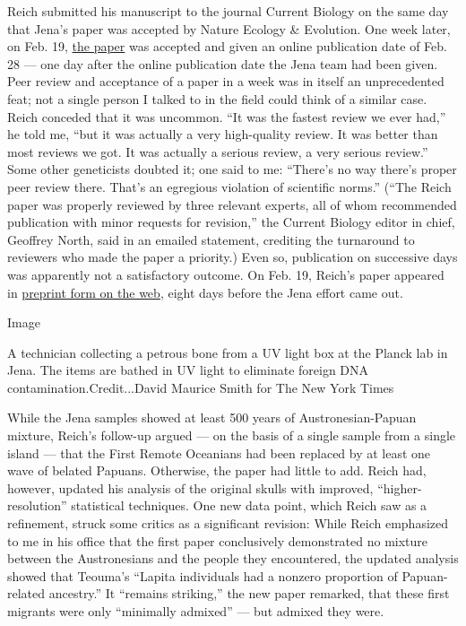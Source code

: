 Reich submitted his manuscript to the journal Current Biology on the
same day that Jena's paper was accepted by Nature Ecology \& Evolution.
One week later, on Feb. 19,
\href{https://www.cell.com/current-biology/fulltext/S0960-9822(18)30236-7?innerTabgraphical_S0960982218302367=}{the
paper} was accepted and given an online publication date of Feb. 28 ---
one day after the online publication date the Jena team had been given.
Peer review and acceptance of a paper in a week was in itself an
unprecedented feat; not a single person I talked to in the field could
think of a similar case. Reich conceded that it was uncommon. ``It was
the fastest review we ever had,'' he told me, ``but it was actually a
very high-quality review. It was better than most reviews we got. It was
actually a serious review, a very serious review.'' Some other
geneticists doubted it; one said to me: ``There's no way there's proper
peer review there. That's an egregious violation of scientific norms.''
(``The Reich paper was properly reviewed by three relevant experts, all
of whom recommended publication with minor requests for revision,'' the
Current Biology editor in chief, Geoffrey North, said in an emailed
statement, crediting the turnaround to reviewers who made the paper a
priority.) Even so, publication on successive days was apparently not a
satisfactory outcome. On Feb. 19, Reich's paper appeared in
\href{https://www.biorxiv.org/content/early/2018/02/19/268037}{preprint
form on the web}, eight days before the Jena effort came out.

Image

A technician collecting a petrous bone from a UV light box at the Planck
lab in Jena. The items are bathed in UV light to eliminate foreign DNA
contamination.Credit...David Maurice Smith for The New York Times

While the Jena samples showed at least 500 years of Austronesian-Papuan
mixture, Reich's follow-up argued --- on the basis of a single sample
from a single island --- that the First Remote Oceanians had been
replaced by at least one wave of belated Papuans. Otherwise, the paper
had little to add. Reich had, however, updated his analysis of the
original skulls with improved, ``higher-resolution'' statistical
techniques. One new data point, which Reich saw as a refinement, struck
some critics as a significant revision: While Reich emphasized to me in
his office that the first paper conclusively demonstrated no mixture
between the Austronesians and the people they encountered, the updated
analysis showed that Teouma's ``Lapita individuals had a nonzero
proportion of Papuan-related ancestry.'' It ``remains striking,'' the
new paper remarked, that these first migrants were only ``minimally
admixed'' --- but admixed they were.

